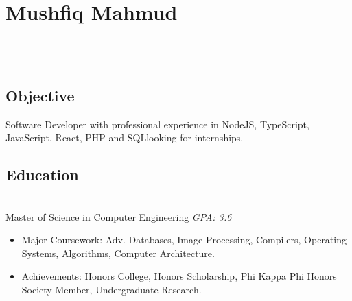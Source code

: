 \documentclass[2pt]{resume}
\begin{document}
\sffamily

\section{Mushfiq Mahmud}

\begin{center}
\address{Tampa, FL}
 \\

 \\
\end{center}


\subsection{Objective}
\small Software Developer with professional experience in NodeJS, TypeScript, JavaScript, React, PHP and SQLlooking for internships.


\subsection{Education}
 \\
Master of Science in Computer Engineering \hfill \emph{GPA: 3.6}

\begin{itemize}
\item \small Major Coursework: Adv. Databases, Image Processing, Compilers, Operating Systems, Algorithms, Computer Architecture.
\item \small Achievements: Honors College, Honors Scholarship, Phi Kappa Phi Honors Society Member, Undergraduate Research.
\end{itemize}

\end{document}
